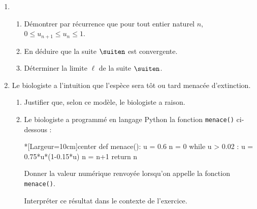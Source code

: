 \begin{enumerate}[resume]
	\item
	\begin{enumerate}
		\item Démontrer par récurrence que pour tout entier naturel $n$, $0 \leqslant u_{n+1} \leqslant u_n \leqslant 1$.
		\item En déduire que la suite $\suiten$ est convergente.
		\item Déterminer la limite $\ell$ de la suite $\suiten$.
	\end{enumerate}
	\item Le biologiste a l’intuition que l’espèce sera tôt ou tard menacée d’extinction.
	\begin{enumerate}
		\item Justifier que, selon ce modèle, le biologiste a raison.
		\item Le biologiste a programmé en langage \textsf{Python} la fonction \texttt{menace()} ci-dessous :
		
\begin{CodePythonLstAlt}*[Largeur=10cm]{center}
def menace():
	u = 0.6
	n = 0
	while u > 0.02 :
		u = 0.75*u*(1-0.15*u)
		n = n+1
	return n
\end{CodePythonLstAlt}
		
		Donner la valeur numérique renvoyée lorsqu'on appelle la fonction \texttt{menace()}.
		
		Interpréter ce résultat dans le contexte de l’exercice.
	\end{enumerate}
\end{enumerate}

